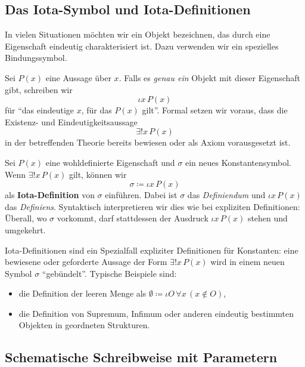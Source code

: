\documentclass[main.tex]{subfiles}
\begin{document}
\subsection{Das Iota-Symbol und Iota-Definitionen}

In vielen Situationen möchten wir ein Objekt bezeichnen, das durch
eine Eigenschaft eindeutig charakterisiert ist. Dazu verwenden wir
ein spezielles Bindungssymbol.

\begin{definition}
Sei \(P(x)\) eine Aussage über \(x\). Falls es \emph{genau ein}
Objekt mit dieser Eigenschaft gibt, schreiben wir
\[
  \iota x\,P(x)
\]
für \enquote{das eindeutige \(x\), für das \(P(x)\) gilt}. Formal
setzen wir voraus, dass die Existenz- und Eindeutigkeitsaussage
\[
  \exists! x\,P(x)
\]
in der betreffenden Theorie bereits bewiesen oder als Axiom
vorausgesetzt ist.
\end{definition}

\begin{definition}
Sei \(P(x)\) eine wohldefinierte Eigenschaft und \(\sigma\) ein
neues Konstantensymbol. Wenn \(\exists! x\,P(x)\) gilt, können wir
\[
  \sigma \coloneqq \iota x\,P(x)
\]
als \textbf{Iota-Definition} von \(\sigma\) einführen. Dabei ist
\(\sigma\) das \emph{Definiendum} und \(\iota x\,P(x)\) das
\emph{Definiens}. Syntaktisch interpretieren wir dies wie bei
expliziten Definitionen: Überall, wo \(\sigma\) vorkommt, darf
stattdessen der Ausdruck \(\iota x\,P(x)\) stehen und umgekehrt.
\end{definition}

\begin{remark}
Iota-Definitionen sind ein Spezialfall expliziter Definitionen
für Konstanten: eine bewiesene oder geforderte Aussage der Form
\(\exists! x\,P(x)\) wird in einem neuen Symbol \(\sigma\)
\enquote{gebündelt}. Typische Beispiele sind:
\begin{itemize}
  \item die Definition der leeren Menge als
        \(\emptyset \coloneqq \iota O\,\forall x\,(x\notin O)\),
  \item die Definition von Supremum, Infimum oder anderen
        eindeutig bestimmten Objekten in geordneten Strukturen.
\end{itemize}
\end{remark}

\subsection{Schematische Schreibweise mit Parametern}
\end{document}

